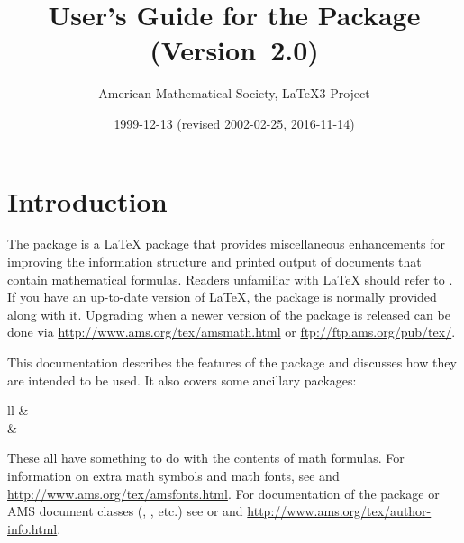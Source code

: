 \documentclass[leqno,titlepage,openany]{amsldoc}[1999/12/13]
\title{User's Guide for the \pkg{amsmath} Package (Version~2.0)}
\author{American Mathematical Society, \LaTeX3 Project}
\date{1999-12-13 (revised 2002-02-25, 2016-11-14)}
\begin{document}
\frontmatter

\maketitle
\pagestyle{headings}
\tableofcontents
\cleardoublepage %

\mainmatter
\chapter{Introduction}

The  package is a \LaTeX{} package that provides
miscellaneous enhancements for improving the information structure and
printed output of documents that contain mathematical formulas. Readers
unfamiliar with \LaTeX{} should refer to \cite{lamport}. If you have an
up-to-date version of \LaTeX{}, the  package is normally
provided along with it. Upgrading when a newer version of the
 package is released can be done via
\url{http://www.ams.org/tex/amsmath.html} or
\url{ftp://ftp.ams.org/pub/tex/}.

This documentation describes the features of the  package
and discusses how they are intended to be used. It also covers some
ancillary packages:
\begin{ctab}{ll}
& \\
& \\
\end{ctab}
These all have something to do with the contents of math formulas. For
information on extra math symbols and math fonts, see \cite{amsfonts}
and \url{http://www.ams.org/tex/amsfonts.html}. For documentation of the
 package or AMS document classes (,
, etc.\@) see \cite{amsthdoc} or \cite{instr-l} and
\url{http://www.ams.org/tex/author-info.html}.
\end{document}
